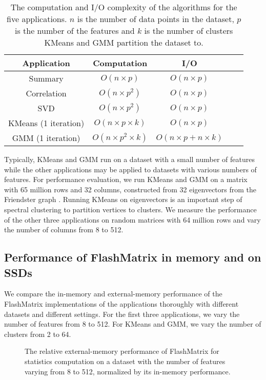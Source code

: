 \begin{table}
\begin{center}
\footnotesize
\begin{tabular}{|c|c|c|c|c|}
\hline
Application & Computation & I/O \\
\hline
Summary & $O(n \times p)$ & $O(n \times p)$ \\
\hline
Correlation & $O(n \times p^2)$ & $O(n \times p)$ \\
\hline
SVD & $O(n \times p^2)$ & $O(n \times p)$ \\
\hline
KMeans (1 iteration) & $O(n \times p \times k)$ & $O(n \times p)$ \\
\hline
GMM (1 iteration) & $O(n \times p^2 \times k)$ & $O(n \times p + n \times k)$ \\
\hline
\end{tabular}
\normalsize
\end{center}
\caption{The computation and I/O complexity of the algorithms for the five
	applications. $n$ is the number of data points in the dataset, $p$ is
	the number of the features and $k$ is the number of clusters KMeans and
GMM partition the dataset to.}
\label{tbl:algs}
\end{table}

Typically, KMeans and GMM run on a dataset with a small number of features
while the other applications may be applied to datasets with various numbers
of features. For performance evaluation, we run KMeans and GMM on a matrix
with 65 million rows and 32 columns, constructed from 32 eigenvectors from
the Friendster graph \cite{friendster}. Running KMeans on eigenvectors is
an important step of spectral clustering \cite{} to partition vertices to
clusters. We measure the performance of the other three applications on
random matrices with 64 million rows and vary the number of columns from 8
to 512.

\subsection{Performance of FlashMatrix in memory and on SSDs}

We compare the in-memory and external-memory performance of the FlashMatrix
implementations of the applications thoroughly with different datasets and
different settings. For the first three applications, we vary the number of
features from 8 to 512. For KMeans and GMM, we vary the number of clusters
from 2 to 64.

\begin{figure}
	\begin{center}
		\footnotesize
		
		\caption{The relative external-memory performance of FlashMatrix for
			statistics computation on a dataset with the number of features
		varying from 8 to 512, normalized by its in-memory performance.}
		\label{perf:stat}
	\end{center}
\end{figure}

